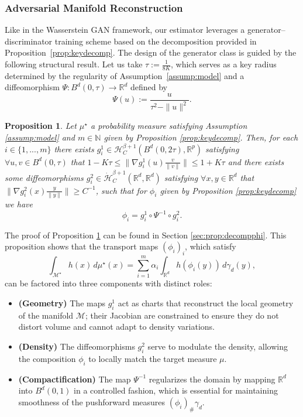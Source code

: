 \documentclass[10pt]{article}
\newtheorem{proposition}{Proposition}
\begin{document}
\subsubsection{Adversarial Manifold Reconstruction}\label{sec:amr}
Like in the Wasserstein GAN framework, our estimator leverages a generator–discriminator training scheme based on the decomposition provided in Proposition~\ref{prop:keydecomp}. The design of the generator class is guided by the following structural result. Let us take $\tau := \frac{1}{8K}$, which serves as a key radius determined by the regularity of  Assumption~\ref{assump:model} and a diffeomorphism $\Psi:B^d(0,\tau)\rightarrow \mathbb{R}^d$ defined by 
\begin{equation}\label{eq:diffeoloin}
    \Psi(u):= \frac{u}{\tau^2-\|u\|^2}.
\end{equation}
\begin{proposition}\label{prop:decompphi}
       Let $\mu^\star$ a probability measure satisfying Assumption \ref{assump:model} and $m\in \mathbb{N}$ given by Proposition \ref{prop:keydecomp}. Then, for each $i\in \{1,...,m\}$ there exists $g_i^1\in\mathcal{H}^{\beta+1}_{C}(B^d(0,2\tau),\mathbb{R}^p)$ satisfying $\forall u,v\in B^d(0,\tau)$ that
    $1-K\tau\leq \|\nabla g_i^1(u)\frac{v}{\|v\|}\|\leq 1+K\tau$ and there exists some diffeomorphisms $g_i^2\in\dot{\mathcal{H}}^{\beta+1}_{C}(\mathbb{R}^d,\mathbb{R}^d)$ satisfying $\forall x,y\in \mathbb{R}^d$ that
    $\|\nabla g_i^2(x)\frac{y}{\|y\|}\|\geq C^{-1}$, such that for $\phi_i$ given by Proposition \ref{prop:keydecomp} we have
    $$\phi_i = g_i^1\circ \Psi^{-1}\circ g_i^2.$$
\end{proposition}
The proof of Proposition \ref{prop:decompphi} can be found in Section \ref{sec:prop:decompphi}. This proposition shows that the transport maps \( (\phi_i )_i\), which satisfy
\[
\int_{\mathcal{M}^\star} h(x)\, d\mu^\star(x) = \sum_{i=1}^m \alpha_i \int_{\mathbb{R}^d} h(\phi_i(y))\, d\gamma_d(y),
\]
can be factored into three components with distinct roles:

\begin{itemize}
    \item \textbf{(Geometry)} The maps \( g_i^1 \) act as charts that reconstruct the local geometry of the manifold \( \mathcal{M} \); their Jacobian are constrained to ensure they do not distort volume and cannot adapt to density variations.
    \item \textbf{(Density)} The diffeomorphisms \( g_i^2 \) serve to modulate the density, allowing the composition \( \phi_i \) to locally match the target measure \( \mu \).
    \item \textbf{(Compactification)} The map \( \Psi^{-1} \) regularizes the domain by mapping \( \mathbb{R}^d \) into \( B^d(0,1) \) in a controlled fashion, which is essential for maintaining smoothness of the pushforward measures \( (\phi_i)_{\#} \gamma_d \).
\end{itemize}
\end{document}
